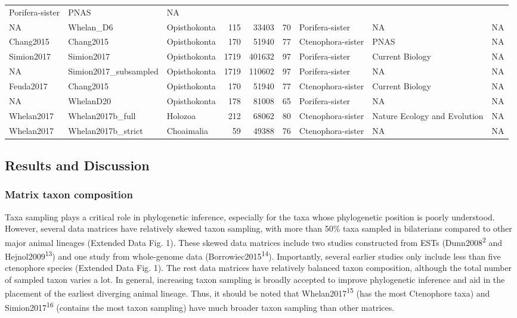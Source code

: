 \documentclass[]{article}
\begin{document}
\begin{longtable}[]{@{}lllrrrlll@{}}
Porifera-sister & PNAS & NA\tabularnewline
NA & Whelan\_D6 & Opisthokonta & 115 & 33403 & 70 & Porifera-sister & NA
& NA\tabularnewline
Chang2015 & Chang2015 & Opisthokonta & 170 & 51940 & 77 &
Ctenophora-sister & PNAS & NA\tabularnewline
Simion2017 & Simion2017 & Opisthokonta & 1719 & 401632 & 97 &
Porifera-sister & Current Biology & NA\tabularnewline
NA & Simion2017\_subsampled & Opisthokonta & 1719 & 110602 & 97 &
Porifera-sister & NA & NA\tabularnewline
Feuda2017 & Chang2015 & Opisthokonta & 170 & 51940 & 77 &
Ctenophora-sister & Current Biology & NA\tabularnewline
NA & WhelanD20 & Opisthokonta & 178 & 81008 & 65 & Porifera-sister & NA
& NA\tabularnewline
Whelan2017 & Whelan2017b\_full & Holozoa & 212 & 68062 & 80 &
Ctenophora-sister & Nature Ecology and Evolution & NA\tabularnewline
Whelan2017 & Whelan2017b\_strict & Choaimalia & 59 & 49388 & 76 &
Ctenophora-sister & NA & NA\tabularnewline
\bottomrule
\end{longtable}

\hypertarget{results-and-discussion}{%
\subsection{Results and Discussion}\label{results-and-discussion}}

\hypertarget{matrix-taxon-composition}{%
\subsubsection{Matrix taxon
composition}\label{matrix-taxon-composition}}

Taxa sampling plays a critical role in phylogenetic inference,
especially for the taxa whose phylogenetic position is poorly
understood. However, several data matrices have relatively skewed taxon
sampling, with more than 50\% taxa sampled in bilaterians compared to
other major animal lineages (Extended Data Fig. 1). These skewed data
matrices include two studies constructed from ESTs
(Dunn2008\textsuperscript{2} and Hejnol2009\textsuperscript{13}) and one
study from whole-genome data (Borrowiec2015\textsuperscript{14}).
Importantly, several earlier studies only include less than five
ctenophore species (Extended Data Fig. 1). The rest data matrices have
relatively balanced taxon composition, although the total number of
sampled taxon varies a lot. In general, increasing taxon sampling is
broadly accepted to improve phylogenetic inference and aid in the
placement of the earliest diverging animal lineage. Thus, it should be
noted that Whelan2017\textsuperscript{15} (has the most Ctenophore taxa)
and Simion2017\textsuperscript{16} (contains the most taxon sampling)
have much broader taxon sampling than other matrices.
\end{document}
